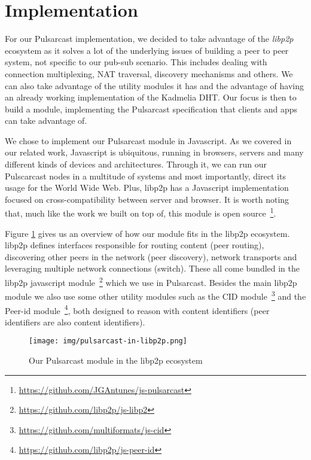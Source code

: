 
\section{Implementation}
\label{section:implementation}

For our Pulsarcast implementation, we decided to take advantage of the
\emph{libp2p} ecosystem as it solves a lot of the underlying issues of building
a peer to peer system, not specific to our pub-sub scenario. This includes
dealing with connection multiplexing, NAT traversal, discovery mechanisms and
others. We can also take advantage of the utility modules it has and the
advantage of having an already working implementation of the Kadmelia DHT. Our
focus is then to build a module, implementing the Pulsarcast specification that
clients and apps can take advantage of. 

We chose to implement our Pulsarcast module in Javascript. As we covered in our
related work, Javascript is ubiquitous, running in browsers, servers and many
different kinds of devices and architectures. Through it, we can run our
Pulscarcast nodes in a multitude of systems and most importantly, direct its
usage for the World Wide Web. Plus, libp2p has a Javascript implementation
focused on cross-compatibility between server and browser. It is worth
noting that, much like the work we built on top of, this module is open
source~\footnote{\url{https://github.com/JGAntunes/js-pulsarcast}}.

Figure \ref{fig:pulsarcast-in-libp2p} gives us an overview of how our module
fits in the libp2p ecosystem. libp2p defines interfaces responsible for routing
content (peer routing), discovering other peers in the network (peer
discovery), network transports and leveraging multiple network connections
(switch). These all come bundled in the libp2p javascript
module~\footnote{\url{https://github.com/libp2p/js-libp2}} which we use in
Pulsarcast. Besides the main libp2p module we also use some other utility
modules such as the CID
module~\footnote{\url{https://github.com/multiformats/js-cid}} and the Peer-id
module~\footnote{\url{https://github.com/libp2p/js-peer-id}}, both designed to
reason with content identifiers (peer identifiers are also content
identifiers). 

\begin{figure}[hb!]
  \centering
  \texttt{[image: img/pulsarcast-in-libp2p.png]}
  \caption{Our Pulsarcast module in the libp2p ecosystem}
  \label{fig:pulsarcast-in-libp2p}
\end{figure}


